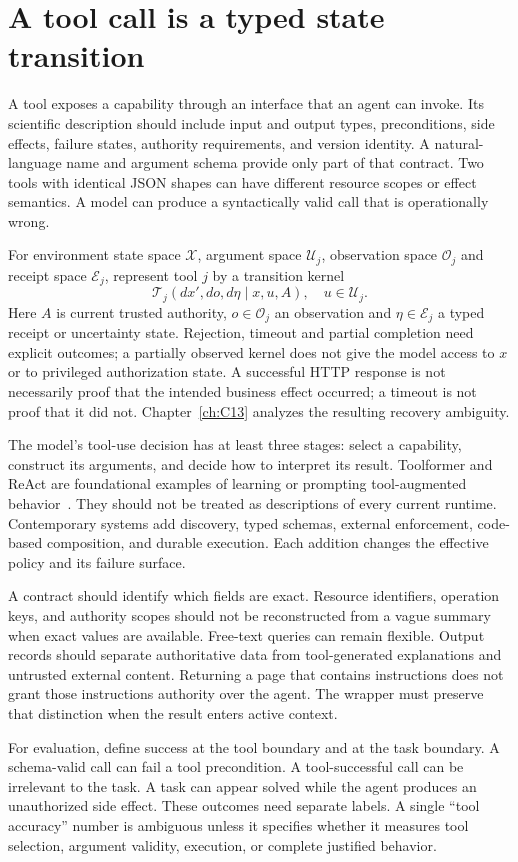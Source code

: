 \section{A tool call is a typed state transition}\label{sec:C18:contract}
A tool exposes a capability through an interface that an agent can invoke. Its scientific description should include input and output types, preconditions, side effects, failure states, authority requirements, and version identity. A natural-language name and argument schema provide only part of that contract. Two tools with identical JSON shapes can have different resource scopes or effect semantics. A model can produce a syntactically valid call that is operationally wrong.

For environment state space $\mathcal X$, argument space $\mathcal U_j$, observation space $\mathcal O_j$ and receipt space $\mathcal E_j$, represent tool $j$ by a transition kernel
\begin{equation}
 \mathcal T_j(dx',do,d\eta\mid x,u,A),
 \quad u\in\mathcal U_j.
\end{equation}
Here $A$ is current trusted authority, $o\in\mathcal O_j$ an observation and $\eta\in\mathcal E_j$ a typed receipt or uncertainty state. Rejection, timeout and partial completion need explicit outcomes; a partially observed kernel does not give the model access to $x$ or to privileged authorization state. A successful HTTP response is not necessarily proof that the intended business effect occurred; a timeout is not proof that it did not. Chapter~\ref{ch:C13} analyzes the resulting recovery ambiguity.

The model's tool-use decision has at least three stages: select a capability, construct its arguments, and decide how to interpret its result. Toolformer and ReAct are foundational examples of learning or prompting tool-augmented behavior~\cite{schick2023toolformer,yao2022react}. They should not be treated as descriptions of every current runtime. Contemporary systems add discovery, typed schemas, external enforcement, code-based composition, and durable execution. Each addition changes the effective policy and its failure surface.

A contract should identify which fields are exact. Resource identifiers, operation keys, and authority scopes should not be reconstructed from a vague summary when exact values are available. Free-text queries can remain flexible. Output records should separate authoritative data from tool-generated explanations and untrusted external content. Returning a page that contains instructions does not grant those instructions authority over the agent. The wrapper must preserve that distinction when the result enters active context.

For evaluation, define success at the tool boundary and at the task boundary. A schema-valid call can fail a tool precondition. A tool-successful call can be irrelevant to the task. A task can appear solved while the agent produces an unauthorized side effect. These outcomes need separate labels. A single ``tool accuracy'' number is ambiguous unless it specifies whether it measures tool selection, argument validity, execution, or complete justified behavior.

